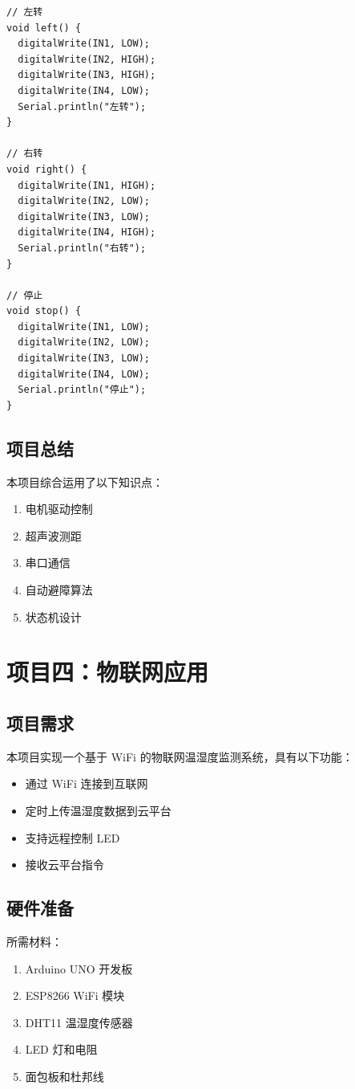 \documentclass[12pt,UTF8]{ctexbook}
\begin{document}
\begin{lstlisting}
// 左转
void left() {
  digitalWrite(IN1, LOW);
  digitalWrite(IN2, HIGH);
  digitalWrite(IN3, HIGH);
  digitalWrite(IN4, LOW);
  Serial.println("左转");
}

// 右转
void right() {
  digitalWrite(IN1, HIGH);
  digitalWrite(IN2, LOW);
  digitalWrite(IN3, LOW);
  digitalWrite(IN4, HIGH);
  Serial.println("右转");
}

// 停止
void stop() {
  digitalWrite(IN1, LOW);
  digitalWrite(IN2, LOW);
  digitalWrite(IN3, LOW);
  digitalWrite(IN4, LOW);
  Serial.println("停止");
}
\end{lstlisting}

\section{项目总结}

本项目综合运用了以下知识点：
\begin{enumerate}
    \item 电机驱动控制
    \item 超声波测距
    \item 串口通信
    \item 自动避障算法
    \item 状态机设计
\end{enumerate}

\chapter{项目四：物联网应用}

\section{项目需求}

本项目实现一个基于 WiFi 的物联网温湿度监测系统，具有以下功能：
\begin{itemize}
    \item 通过 WiFi 连接到互联网
    \item 定时上传温湿度数据到云平台
    \item 支持远程控制 LED
    \item 接收云平台指令
\end{itemize}

\section{硬件准备}

所需材料：
\begin{enumerate}
    \item Arduino UNO 开发板
    \item ESP8266 WiFi 模块
    \item DHT11 温湿度传感器
    \item LED 灯和电阻
    \item 面包板和杜邦线
\end{enumerate}
\end{document}
